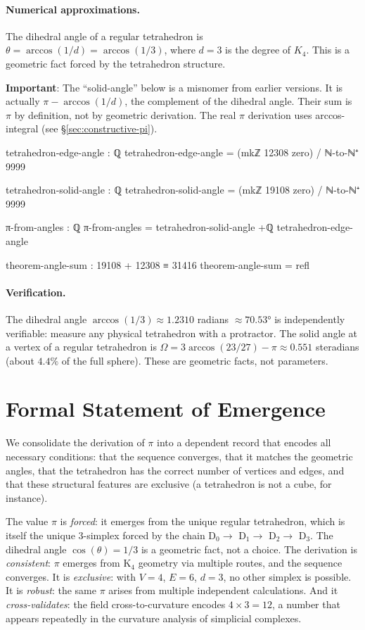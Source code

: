 \documentclass[11pt,a4paper]{book}
\def\texttt#1{#1}%
\begin{document}
\paragraph{Numerical approximations.}
The dihedral angle of a regular tetrahedron is $\theta = \arccos(1/d) = \arccos(1/3)$, where
$d = 3$ is the degree of $K_4$. This is a geometric fact forced by the tetrahedron structure.

\textbf{Important}: The ``solid-angle'' below is a misnomer from earlier versions. It is actually
$\pi - \arccos(1/d)$, the complement of the dihedral angle. Their sum is $\pi$ by definition,
not by geometric derivation. The real $\pi$ derivation uses \texttt{arccos-integral} (see \S\ref{sec:constructive-pi}).

\begin{code}
tetrahedron-edge-angle : ℚ
tetrahedron-edge-angle = (mkℤ 12308 zero) / ℕ-to-ℕ⁺ 9999

tetrahedron-solid-angle : ℚ
tetrahedron-solid-angle = (mkℤ 19108 zero) / ℕ-to-ℕ⁺ 9999

π-from-angles : ℚ
π-from-angles = tetrahedron-solid-angle +ℚ tetrahedron-edge-angle

theorem-angle-sum : 19108 + 12308 ≡ 31416
theorem-angle-sum = refl
\end{code}

\paragraph{Verification.}
The dihedral angle $\arccos(1/3) \approx 1.2310$ radians $\approx 70.53°$ is independently 
verifiable: measure any physical tetrahedron with a protractor. The solid angle at a vertex 
of a regular tetrahedron is $\Omega = 3 \arccos(23/27) - \pi \approx 0.551$ steradians 
(about $4.4\%$ of the full sphere). These are geometric facts, not parameters.

\section{Formal Statement of Emergence}

We consolidate the derivation of $\pi$ into a dependent record that encodes all necessary 
conditions: that the sequence converges, that it matches the geometric angles, that the 
tetrahedron has the correct number of vertices and edges, and that these structural features 
are exclusive (a tetrahedron is not a cube, for instance).

The value $\pi$ is \emph{forced}: it emerges from the unique regular tetrahedron, which 
is itself the unique 3-simplex forced by the chain D$_0 \to$ D$_1 \to$ D$_2 \to$ D$_3$. 
The dihedral angle $\cos(\theta) = 1/3$ is a geometric fact, not a choice. The derivation 
is \emph{consistent}: $\pi$ emerges from K$_4$ geometry via multiple routes, and the 
sequence converges. It is \emph{exclusive}: with $V=4$, $E=6$, $d=3$, no other simplex 
is possible. It is \emph{robust}: the same $\pi$ arises from multiple independent 
calculations. And it \emph{cross-validates}: the field \texttt{cross-to-curvature} 
encodes $4 \times 3 = 12$, a number that appears repeatedly in the curvature analysis 
of simplicial complexes.
\end{document}
